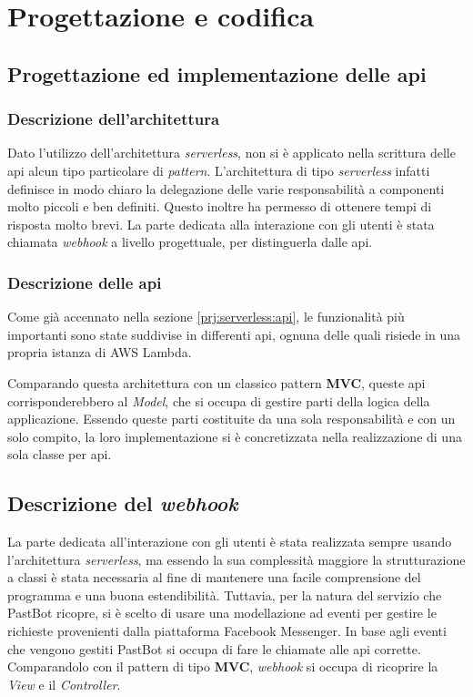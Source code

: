 
\chapter{Progettazione e codifica}

\section{Progettazione ed implementazione delle \gls{api}}

\subsection{Descrizione dell'architettura}

Dato l'utilizzo dell'architettura \textit{serverless}, non si è applicato nella
scrittura delle \gls{api} alcun tipo particolare di \textit{pattern}.
L'architettura di tipo \textit{serverless} infatti definisce in modo chiaro la
delegazione delle varie responsabilità a componenti molto piccoli e ben
definiti. Questo inoltre ha permesso di ottenere tempi di risposta molto brevi.
La parte dedicata alla interazione con gli utenti è stata chiamata
\textit{webhook} a livello progettuale, per distinguerla dalle \gls{api}.

\subsection{Descrizione delle \gls{api}}
Come già accennato nella sezione \ref{prj:serverless:api}, le funzionalità più
importanti sono state suddivise in differenti \gls{api}, ognuna delle quali
risiede in una propria istanza di AWS Lambda.

Comparando questa architettura con un classico pattern \textbf{MVC}, queste
\gls{api} corrisponderebbero al \textit{Model}, che si occupa di gestire parti
della logica della applicazione. Essendo queste parti costituite da una sola
responsabilità e con un solo compito, la loro implementazione si è
concretizzata nella realizzazione di una sola classe per \gls{api}.

\section{Descrizione del \textit{webhook}}
La parte dedicata all'interazione con gli utenti è stata realizzata sempre
usando l'architettura \textit{serverless}, ma essendo la sua complessità
maggiore la strutturazione a classi è stata necessaria al fine di mantenere una
facile comprensione del programma e una buona estendibilità. Tuttavia, per la
natura del servizio che PastBot ricopre, si è scelto di usare una modellazione
ad eventi per gestire le richieste provenienti dalla piattaforma Facebook
Messenger. In base agli eventi che vengono gestiti PastBot si occupa di fare le
chiamate alle \gls{api} corrette. Comparandolo con il pattern di tipo
\textbf{MVC}, \textit{webhook} si occupa di ricoprire la \textit{View} e il
\textit{Controller}.

